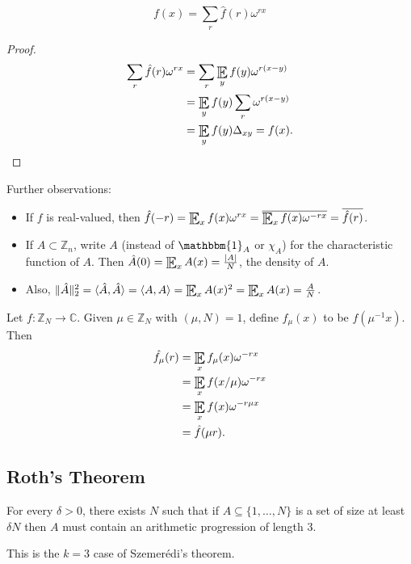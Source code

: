 \documentclass{article}
\DeclareMathOperator*{\E}{\scalerel*{\mathbb{E}}{\textstyle\sum}}
\newcommand{\1}[1]{\mathbbm{1}_{#1}}
\begin{document}
\begin{nlemma}
  \begin{equation*}
    f(x) = \sum_r \hat{f}(r) \omega^{r x}
  \end{equation*}
\end{nlemma}
\begin{proof}
  \begin{align*}
    \sum_r \hat{f}(r) \omega^{r x} &= \sum_r \E_y f(y) \omega^{r (x-y)} \\
                                   &= \E_y f(y) \sum_r \omega^{r (x-y)} \\
                                   &= \E_y f(y) \Delta_{x y} = f(x). \qedhere
  \end{align*}
\end{proof}

Further observations:
\begin{itemize}
  \item If $f$ is real-valued, then $\hat{f}(-r) = \E_x f(x) \omega^{r x} = \overline{\E_x f(x) \omega^{- r x}} = \overline{\hat{f}(r)}$.
  \item If $A \subset \mathbb{Z}_n$, write $A$ (instead of $\1{A}$ or $\chi_A$) for the characteristic function of $A$.
    Then $\hat{A}(0) = \E_x A(x) = \frac{|A|}{N}$, the density of $A$.
  \item Also, $\|\hat{A}\|^2_2 = \langle \hat{A}, \hat{A} \rangle = \langle A, A \rangle = \E_x A(x)^2 = \E_x A(x) = \frac{A}{N}$.
\end{itemize}

Let $f : \mathbb{Z}_N \to \mathbb{C}$. Given $\mu \in \mathbb{Z}_N$ with $(\mu,N) = 1$, define $f_\mu(x)$ to be $f(\mu^{-1}x)$.
Then
\begin{align*}
  \hat{f_\mu}(r) &= \E_x f_\mu(x) \omega^{-r x} \\
                 &= \E_x f(x / \mu) \omega^{-r x}  \\
                 &= \E_x f(x) \omega^{- r \mu x}  \\
                 &= \hat{f}(\mu r).
\end{align*}

\subsection{Roth's Theorem}
\begin{nthm}
  For every $\delta > 0$, there exists $N$ such that if $A \subseteq \{1, \dotsc, N\}$ is a set of size at least $\delta N$ then $A$ must contain an arithmetic progression of length 3.
\end{nthm}
This is the $k=3$ case of Szemer\'{e}di's theorem.
\end{document}
